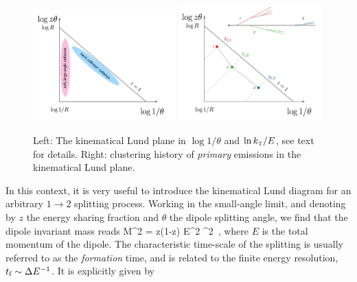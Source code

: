 \begin{figure}
\centering
\includegraphics[width=0.49\textwidth]{figures/kinematics/LundPlot_Regimes_test3}%
\includegraphics[width=0.49\textwidth]{figures/kinematics/LundPlot_SplittingHistory_test3}%
\caption{Left: The kinematical Lund plane in $\log 1/\theta$ and $\ln k_{\text{\tiny T}}/E$, see text for details. Right: clustering history of {\sl primary} emissions in the kinematical Lund plane.
}
\label{fig:PS0}
\end{figure}
In this context, it is very useful to introduce the kinematical Lund diagram \cite{Andersson:1988gp} for an arbitrary $1\to 2$ splitting process. 
Working in the small-angle limit, and denoting by $z$ the energy sharing fraction and $\theta$ the dipole splitting angle, we find that the dipole invariant mass reads
\beq
\label{eq:DipoleMass}
M^2 = z(1-z) E^2 \theta^2 \,,
\eeq
where $E$ is the total momentum of the dipole.
The characteristic time-scale of the splitting is usually referred to as the \textsl{formation} time, and is related to the 
finite energy resolution,
$t_\text{f} \sim \Delta E^{-1}$. It is explicitly given by
